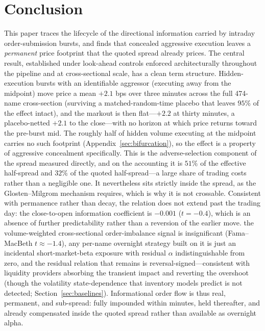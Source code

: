 \documentclass[11pt]{article}
\begin{document}
\section{Conclusion}
This paper traces the lifecycle of the directional information carried by intraday order-submission bursts, and finds that concealed aggressive execution leaves a \emph{permanent} price footprint that the quoted spread already prices. The central result, established under look-ahead controls enforced architecturally throughout the pipeline and at cross-sectional scale, has a clean term structure. Hidden-execution bursts with an identifiable aggressor (executing away from the midpoint) move price a mean $+2.1$ bps over three minutes across the full 474-name cross-section (surviving a matched-random-time placebo that leaves $95\%$ of the effect intact), and the markout is then flat---$+2.2$ at thirty minutes, a placebo-netted $+2.1$ to the close---with no horizon at which price returns toward the pre-burst mid. The roughly half of hidden volume executing at the midpoint carries no such footprint (Appendix~\ref{sec:bifurcation}), so the effect is a property of aggressive concealment specifically. This is the adverse-selection component of the spread measured directly, and on the \citet{huangstoll1997} accounting it is $51\%$ of the effective half-spread and $32\%$ of the quoted half-spread---a large share of trading costs rather than a negligible one. It nevertheless sits strictly inside the spread, as the Glosten--Milgrom mechanism requires, which is why it is not crossable. Consistent with permanence rather than decay, the relation does not extend past the trading day: the close-to-open information coefficient is $-0.001$ ($t=-0.4$), which is an absence of further predictability rather than a reversion of the earlier move. the volume-weighted cross-sectional order-imbalance signal is insignificant (Fama--MacBeth $t\approx-1.4$), any per-name overnight strategy built on it is just an incidental short-market-beta exposure with residual $\alpha$ indistinguishable from zero, and the residual relation that remains is reversal-signed---consistent with liquidity providers absorbing the transient impact and reverting the overshoot (though the volatility state-dependence that inventory models predict is not detected; Section~\ref{sec:baselines}). Informational order flow is thus real, permanent, and sub-spread: fully impounded within minutes, held thereafter, and already compensated inside the quoted spread rather than available as overnight alpha.
\end{document}

